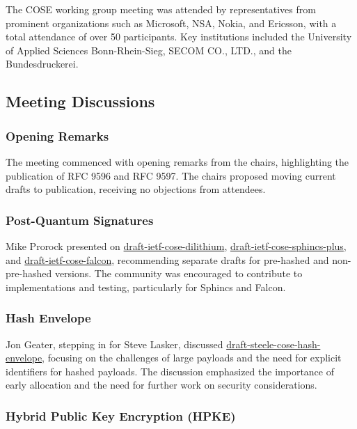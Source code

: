 \documentclass{article}
\begin{document}
The COSE working group meeting was attended by representatives from prominent organizations such as Microsoft, NSA, Nokia, and Ericsson, with a total attendance of over 50 participants. Key institutions included the University of Applied Sciences Bonn-Rhein-Sieg, SECOM CO., LTD., and the Bundesdruckerei.

\subsection{Meeting Discussions}

\subsubsection{Opening Remarks}

The meeting commenced with opening remarks from the chairs, highlighting the publication of RFC 9596 and RFC 9597. The chairs proposed moving current drafts to publication, receiving no objections from attendees.

\subsubsection{Post-Quantum Signatures}

Mike Prorock presented on \href{https://datatracker.ietf.org/doc/html/draft-ietf-cose-dilithium}{draft-ietf-cose-dilithium}, \href{https://datatracker.ietf.org/doc/html/draft-ietf-cose-sphincs-plus}{draft-ietf-cose-sphincs-plus}, and \href{https://datatracker.ietf.org/doc/html/draft-ietf-cose-falcon}{draft-ietf-cose-falcon}, recommending separate drafts for pre-hashed and non-pre-hashed versions. The community was encouraged to contribute to implementations and testing, particularly for Sphincs and Falcon.

\subsubsection{Hash Envelope}

Jon Geater, stepping in for Steve Lasker, discussed \href{https://datatracker.ietf.org/doc/html/draft-steele-cose-hash-envelope}{draft-steele-cose-hash-envelope}, focusing on the challenges of large payloads and the need for explicit identifiers for hashed payloads. The discussion emphasized the importance of early allocation and the need for further work on security considerations.

\subsubsection{Hybrid Public Key Encryption (HPKE)}
\end{document}
